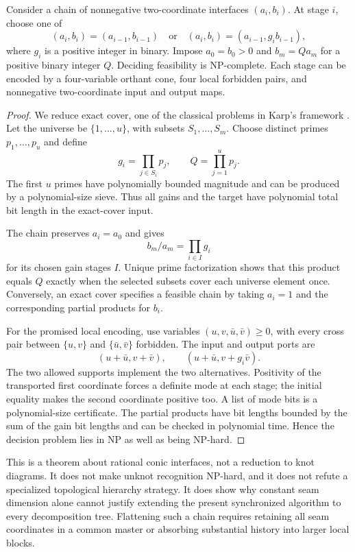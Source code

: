 \begin{theorem}
\label{thm:chain}
Consider a chain of nonnegative two-coordinate interfaces $(a_i,b_i)$. At stage $i$, choose one of
\[
 (a_i,b_i)=(a_{i-1},b_{i-1})\quad\text{or}\quad
 (a_i,b_i)=(a_{i-1},g_i b_{i-1}),
\]
where $g_i$ is a positive integer in binary. Impose $a_0=b_0>0$ and $b_m=Qa_m$ for a positive binary integer $Q$. Deciding feasibility is NP-complete. Each stage can be encoded by a four-variable orthant cone, four local forbidden pairs, and nonnegative two-coordinate input and output maps.
\end{theorem}
\begin{proof}
We reduce exact cover, one of the classical problems in Karp's framework \cite{karp}. Let the universe be $\{1,\ldots,u\}$, with subsets $S_1,\ldots,S_m$. Choose distinct primes $p_1,\ldots,p_u$ and define
\[
 g_i=\prod_{j\in S_i}p_j,\qquad Q=\prod_{j=1}^u p_j.
\]
The first $u$ primes have polynomially bounded magnitude and can be produced by a polynomial-size sieve. Thus all gains and the target have polynomial total bit length in the exact-cover input.

The chain preserves $a_i=a_0$ and gives
\[
 b_m/a_m=\prod_{i\in I}g_i
\]
for its chosen gain stages $I$. Unique prime factorization shows that this product equals $Q$ exactly when the selected subsets cover each universe element once. Conversely, an exact cover specifies a feasible chain by taking $a_i=1$ and the corresponding partial products for $b_i$.

For the promised local encoding, use variables $(u,v,\bar u,\bar v)\ge0$, with every cross pair between $\{u,v\}$ and $\{\bar u,\bar v\}$ forbidden. The input and output ports are
\[
 (u+\bar u,v+\bar v),\qquad (u+\bar u,v+g_i\bar v).
\]
The two allowed supports implement the two alternatives. Positivity of the transported first coordinate forces a definite mode at each stage; the initial equality makes the second coordinate positive too. A list of mode bits is a polynomial-size certificate. The partial products have bit lengths bounded by the sum of the gain bit lengths and can be checked in polynomial time. Hence the decision problem lies in NP as well as being NP-hard.
\end{proof}

This is a theorem about rational conic interfaces, not a reduction to knot diagrams. It does not make unknot recognition NP-hard, and it does not refute a specialized topological hierarchy strategy. It does show why constant seam dimension alone cannot justify extending the present synchronized algorithm to every decomposition tree. Flattening such a chain requires retaining all seam coordinates in a common master or absorbing substantial history into larger local blocks.

